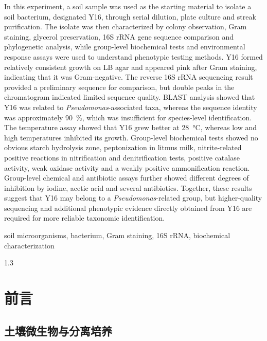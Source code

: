 \documentclass[UTF8,a4paper,12pt,fontset=none]{ctexart}
\numberwithin{figure}{section}
\begin{document}
\vspace{0.8em}
\noindent In this experiment, a soil sample was used as the starting material to isolate a soil bacterium, designated Y16, through serial dilution, plate culture and streak purification. The isolate was then characterized by colony observation, Gram staining, glycerol preservation, 16S rRNA gene sequence comparison and phylogenetic analysis, while group-level biochemical tests and environmental response assays were used to understand phenotypic testing methods. Y16 formed relatively consistent growth on LB agar and appeared pink after Gram staining, indicating that it was Gram-negative. The reverse 16S rRNA sequencing result provided a preliminary sequence for comparison, but double peaks in the chromatogram indicated limited sequence quality. BLAST analysis showed that Y16 was related to \textit{Pseudomonas}-associated taxa, whereas the sequence identity was approximately \SI{90}{\percent}, which was insufficient for species-level identification. The temperature assay showed that Y16 grew better at \SI{28}{\celsius}, whereas low and high temperatures inhibited its growth. Group-level biochemical tests showed no obvious starch hydrolysis zone, peptonization in litmus milk, nitrite-related positive reactions in nitrification and denitrification tests, positive catalase activity, weak oxidase activity and a weakly positive ammonification reaction. Group-level chemical and antibiotic assays further showed different degrees of inhibition by iodine, acetic acid and several antibiotics. Together, these results suggest that Y16 may belong to a \textit{Pseudomonas}-related group, but higher-quality sequencing and additional phenotypic evidence directly obtained from Y16 are required for more reliable taxonomic identification.

\vspace{2.2em}

\vspace{0.8em}
\noindent soil microorganisms, bacterium, Gram staining, 16S rRNA, biochemical characterization

\clearpage
\begin{spacing}{1.3}
\tableofcontents
\end{spacing}
\clearpage

\section{前言}

\subsection{土壤微生物与分离培养}
\end{document}
